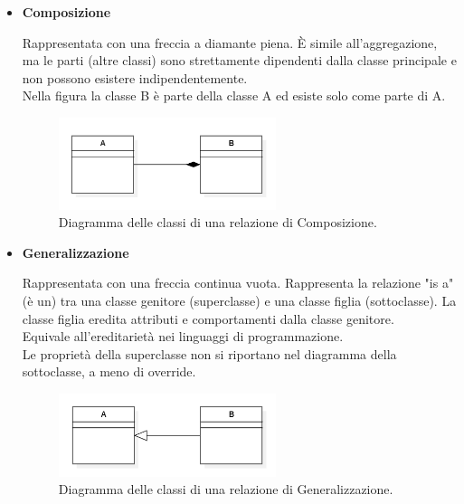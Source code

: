 \begin{itemize}
    \item \textbf{Composizione}
    
    Rappresentata con una freccia a diamante piena. È simile all'aggregazione, ma le parti (altre classi) sono strettamente dipendenti dalla classe principale e non possono esistere indipendentemente. \\
    Nella figura la classe B è parte della classe A ed esiste solo come parte di A.
    \begin{figure}[H]
        \centering
        \includegraphics[width=0.6\textwidth]{../Images/NormeDiProgetto/ClassDiagram_Composizione.PNG}
        \caption{Diagramma delle classi di una relazione di Composizione.}
    \end{figure}

    \vspace{0.4cm}

    \item \textbf{Generalizzazione} 
    
    Rappresentata con una freccia continua vuota. Rappresenta la relazione "is a" (è un) tra una classe genitore (superclasse) e una classe figlia (sottoclasse). La classe figlia eredita attributi e comportamenti dalla classe genitore. \\
    Equivale all'ereditarietà nei linguaggi di programmazione. \\
    Le proprietà della superclasse non si riportano nel diagramma della sottoclasse, a meno di override.
    \begin{figure}[H]
        \centering
        \includegraphics[width=0.6\textwidth]{../Images/NormeDiProgetto/ClassDiagram_Generalizzazione.PNG}
        \caption{Diagramma delle classi di una relazione di Generalizzazione.}
    \end{figure}

    \pagebreak
    

\end{itemize}

